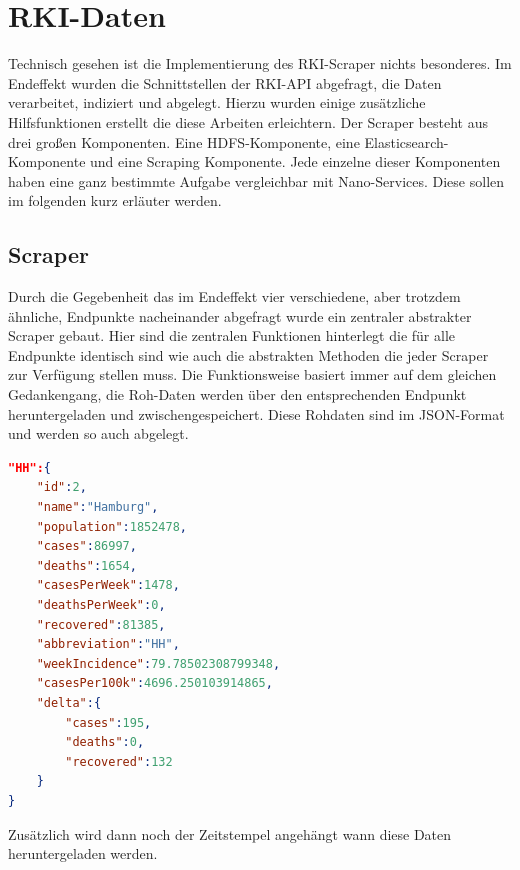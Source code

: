 \documentclass[12pt,oneside,a4paper,parskip]{scrbook}
\begin{document}
\section{RKI-Daten}
Technisch gesehen ist die Implementierung des RKI-Scraper nichts besonderes. Im Endeffekt wurden die Schnittstellen der RKI-API abgefragt, die Daten verarbeitet, indiziert und abgelegt. Hierzu wurden einige zus\"atzliche Hilfsfunktionen erstellt die diese Arbeiten erleichtern. \newline
Der Scraper besteht aus drei großen Komponenten. Eine HDFS-Komponente, eine Elasticsearch-Komponente und eine Scraping Komponente. Jede einzelne dieser Komponenten haben eine ganz bestimmte Aufgabe vergleichbar mit Nano-Services. Diese sollen im folgenden kurz erl\"auter werden.
\subsection{Scraper}
Durch die Gegebenheit das im Endeffekt vier verschiedene, aber trotzdem \"ahnliche, Endpunkte nacheinander abgefragt wurde ein zentraler abstrakter Scraper gebaut. Hier sind die zentralen Funktionen hinterlegt die f\"ur alle Endpunkte identisch sind wie auch die abstrakten Methoden die jeder Scraper zur Verf\"ugung stellen muss. \newline
Die Funktionsweise basiert immer auf dem gleichen Gedankengang, die Roh-Daten werden \"uber den entsprechenden Endpunkt heruntergeladen und zwischengespeichert. Diese Rohdaten sind im JSON-Format und werden so auch abgelegt.
\begin{lstlisting}[caption=Inzidenz Rohdaten der Corona-API ,label=incidencedataraw,language=json]
"HH":{
	"id":2,
	"name":"Hamburg",
	"population":1852478,
	"cases":86997,
	"deaths":1654,
	"casesPerWeek":1478,
	"deathsPerWeek":0,
	"recovered":81385,
	"abbreviation":"HH",
	"weekIncidence":79.78502308799348,
	"casesPer100k":4696.250103914865,
	"delta":{
		"cases":195,
		"deaths":0,
		"recovered":132
	}
}
\end{lstlisting}
Zus\"atzlich wird dann noch der Zeitstempel angeh\"angt wann diese Daten heruntergeladen werden.
\end{document}
